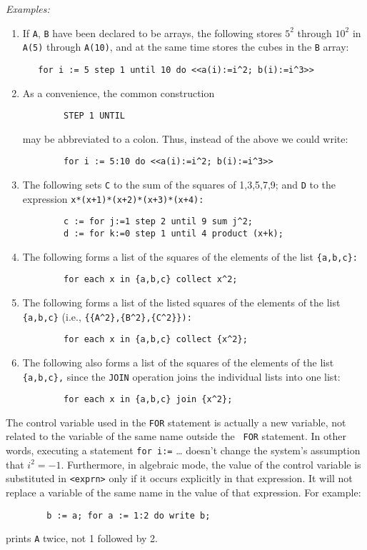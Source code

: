 {\it Examples:}
\begin{enumerate}
\item If {\tt A}, {\tt B} have been declared to be arrays, the following
stores $5^{2}$ through $10^{2}$ in {\tt A(5)} through {\tt A(10)}, and at
the same time stores the cubes in the {\tt B} array:
\begin{verbatim}
   for i := 5 step 1 until 10 do <<a(i):=i^2; b(i):=i^3>>
\end{verbatim}
\item As a convenience, the common construction
\begin{verbatim}
        STEP 1 UNTIL
\end{verbatim}
may be abbreviated to a colon. Thus, instead of the above we could write:
\begin{verbatim}
        for i := 5:10 do <<a(i):=i^2; b(i):=i^3>>
\end{verbatim}
\item The following sets {\tt C} to the sum of the squares of 1,3,5,7,9;
and {\tt D} to the expression {\tt x*(x+1)*(x+2)*(x+3)*(x+4):}
\begin{verbatim}
        c := for j:=1 step 2 until 9 sum j^2;
        d := for k:=0 step 1 until 4 product (x+k);
\end{verbatim}
\item The following forms a list of the squares of the elements of the list
{\tt \{a,b,c\}:}
\begin{verbatim}
        for each x in {a,b,c} collect x^2;
\end{verbatim}
\item The following forms a list of the listed squares of the elements of the
list {\tt \{a,b,c\}} (i.e., {\tt \{\{A\^{ }2\},\{B\^{ }2\},\{C\^{ }2\}\}):}
\begin{verbatim}
        for each x in {a,b,c} collect {x^2};
\end{verbatim}
\item The following also forms a list of the squares of the elements of
the list {\tt \{a,b,c\},} since the {\tt JOIN} operation joins the
individual lists into one list:
\begin{verbatim}
        for each x in {a,b,c} join {x^2};
\end{verbatim}
\end{enumerate}
The control variable used in the {\tt FOR} statement is actually a new
variable, not related to the variable of the same name outside the {\tt
FOR} statement.  In other words, executing a statement {\tt for i:=} \ldots
doesn't change the system's assumption that $i^{2} = -1$.
Furthermore, in algebraic mode, the value of the control variable is
substituted in {\tt <exprn>} only if it occurs explicitly in that
expression.  It will not replace a variable of the same name in the value
of that expression.  For example:
\begin{verbatim}
        b := a; for a := 1:2 do write b;
\end{verbatim}
prints {\tt A} twice, not 1 followed by 2.


